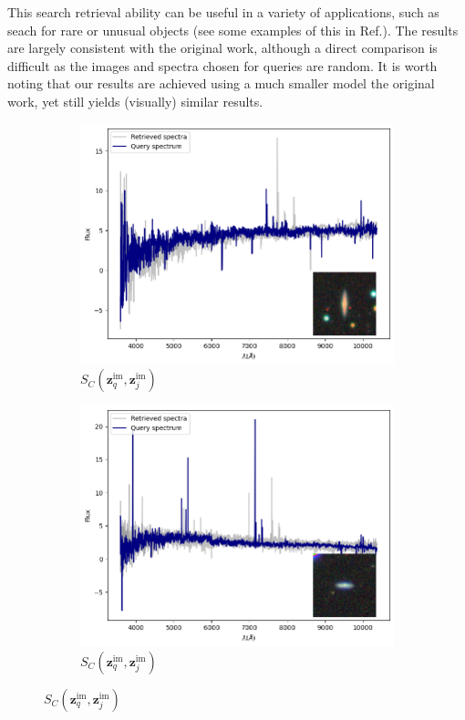 \documentclass[a4paper,12pt]{article}
\begin{document}
This search retrieval ability can be useful in a variety of applications, such as seach for rare or unusual objects (see some examples of this in Ref.\cite{stein}). The results are largely consistent with the original work, although a direct comparison is difficult as the images and spectra chosen for queries are random. It is worth noting that our results are achieved using a much smaller model the original work, yet still yields (visually) similar results.
\begin{figure}[H]
    \centering
    \vspace*{-1.3cm}

    \begin{subfigure}[b]{0.45\textwidth}
        \centering
        \includegraphics[width=\textwidth]{../figures/spectral_retrieval_im_im_1}
        \caption{$S_C(\mathbf{z}_q^{\text{im}}, \mathbf{z}_j^{\text{im}})$}
        \label{fig:im_im_1}
    \end{subfigure}%
    \hfill
    \begin{subfigure}[b]{0.45\textwidth}
        \centering
        \includegraphics[width=\textwidth]{../figures/spectral_retrieval_im_im_2}
        \caption{$S_C(\mathbf{z}_q^{\text{im}}, \mathbf{z}_j^{\text{im}})$}
        \label{fig:im_im_2}
    \end{subfigure}


\end{figure}
\end{document}
